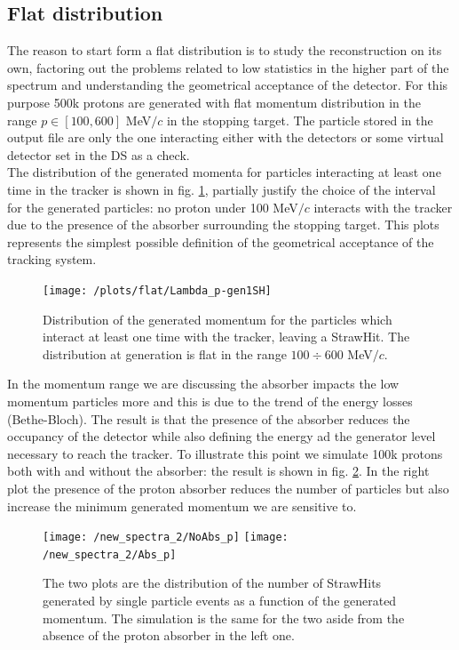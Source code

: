 \documentclass[12pt,a4paper,openright, oneside, titlepage]{book} %
\begin{document}
\subsection{Flat distribution}
The reason to start form a flat distribution is to study the reconstruction on its own, factoring out the problems related to low statistics in the higher part of the spectrum and understanding the geometrical acceptance of the detector. 
For this purpose 500k protons are generated with flat momentum distribution in the range $p\in[100,600]$ MeV$/c$ in the stopping target. The particle stored in the output file are only the one interacting either with the detectors or some virtual detector set in the DS as a check.\\
The distribution of the generated momenta for particles interacting at least one time in the tracker is shown in fig. \ref{_flat_Lambda_p-gen1SH}, partially justify the choice of the interval for the generated particles: no proton under 100 MeV$/c$ interacts with the tracker due to the presence of the absorber surrounding the stopping target. This plots represents the simplest possible definition of the geometrical acceptance of the tracking system. \\

\begin{figure}[h!]
\centering
\texttt{[image: /plots/flat/Lambda\_p-gen1SH]}
\caption{Distribution of the generated momentum for the particles which interact at least one time with the tracker, leaving a StrawHit. The distribution at generation is flat in the range $100 \div 600$ MeV$/c$.}
\label{_flat_Lambda_p-gen1SH}
\end{figure}

\noindent In the momentum range we are discussing the absorber impacts the low momentum particles more and this is due to the trend of the energy losses (Bethe-Bloch). 
The result is that the presence of the absorber reduces the occupancy of the detector while also defining the energy ad the generator level necessary to reach the tracker. 
To illustrate this point we simulate 100k protons both with and without the absorber: the result is shown in fig. \ref{_proton_absorber}. In the right plot the presence of the proton absorber reduces the number of particles but also increase the minimum generated momentum we are sensitive to. \\

\begin{figure}[h!]
\centering
\texttt{[image: /new\_spectra\_2/NoAbs\_p]}\hfill
\texttt{[image: /new\_spectra\_2/Abs\_p]}
\caption{The two plots are the distribution of the number of StrawHits generated by single particle events as a function of the generated momentum. The simulation is the same for the two aside from the absence of the proton absorber in the left one.}
\label{_proton_absorber}
\end{figure}
\end{document}
